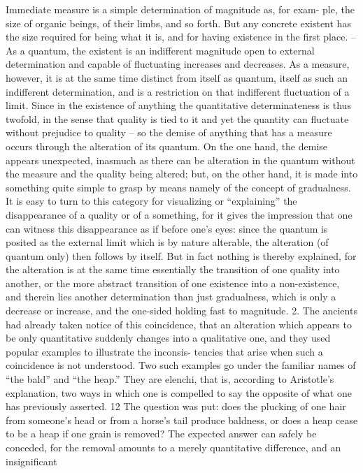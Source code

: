 Immediate measure is a simple determination of magnitude as, for exam-
ple, the size of organic beings, of their limbs, and so forth. But any concrete
existent has the size required for being what it is, and for having existence
in the first place. – As a quantum, the existent is an indifferent magnitude
open to external determination and capable of fluctuating increases and
decreases. As a measure, however, it is at the same time distinct from itself
as quantum, itself as such an indifferent determination, and is a restriction
on that indifferent fluctuation of a limit.
Since in the existence of anything the quantitative determinateness is
thus twofold, in the sense that quality is tied to it and yet the quantity
can fluctuate without prejudice to quality – so the demise of anything that
has a measure occurs through the alteration of its quantum. On the one
hand, the demise appears unexpected, inasmuch as there can be alteration
in the quantum without the measure and the quality being altered; but, on
the other hand, it is made into something quite simple to grasp by means
namely of the concept of gradualness. It is easy to turn to this category for
visualizing or “explaining” the disappearance of a quality or of a something,
for it gives the impression that one can witness this disappearance as if
before one’s eyes: since the quantum is posited as the external limit which
is by nature alterable, the alteration (of quantum only) then follows by
itself. But in fact nothing is thereby explained, for the alteration is at the
same time essentially the transition of one quality into another, or the more
abstract transition of one existence into a non-existence, and therein lies
another determination than just gradualness, which is only a decrease or
increase, and the one-sided holding fast to magnitude.
2. The ancients had already taken notice of this coincidence, that an
alteration which appears to be only quantitative suddenly changes into a
qualitative one, and they used popular examples to illustrate the inconsis-
tencies that arise when such a coincidence is not understood. Two such
examples go under the familiar names of “the bald” and “the heap.” They
are elenchi, that is, according to Aristotle’s explanation, two ways in which
one is compelled to say the opposite of what one has previously asserted. 12
The question was put: does the plucking of one hair from someone’s head
or from a horse’s tail produce baldness, or does a heap cease to be a heap if
one grain is removed? The expected answer can safely be conceded, for the
removal amounts to a merely quantitative difference, and an insignificant
